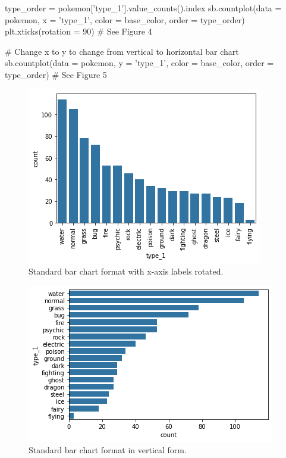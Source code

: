 \begin{python}
	type_order = pokemon['type_1'].value_counts().index
	sb.countplot(data = pokemon, x = 'type_1', color = base_color, order = type_order)
	plt.xticks(rotation = 90) 
	# See Figure 4
	
	# Change x to y to change from vertical to horizontal bar chart
	sb.countplot(data = pokemon, y = 'type_1', color = base_color, order = type_order)
	# See Figure 5
\end{python}

\begin{figure}
	\includegraphics{images/figure4.png}
	\caption{Standard bar chart format with x-axis labels rotated.}\label{fig:figure4}
\end{figure}

\begin{figure}
	\includegraphics{images/figure5.png}
	\caption{Standard bar chart format in vertical form.}\label{fig:figure5}
\end{figure}